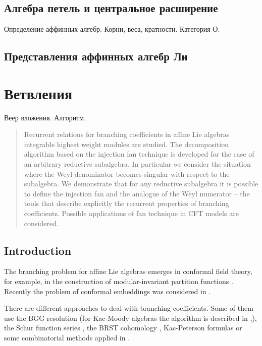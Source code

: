 \subsection{Алгебра петель и центральное расширение}
\label{sec:loop-algebra-central-extension}

Определение аффинных алгебр. Корни, веса, кратности. Категория О.

\subsection{Представления аффинных алгебр Ли}
\label{sec:affine-lie-algebra-representations}


\section{Ветвления}
\label{sec:branching}
Веер вложения. Алгоритм.


\begin{abstract}
  Recurrent relations for branching coefficients in affine Lie algebras
  integrable highest weight modules are studied. The decomposition algorithm
  based on the injection fan technique is developed for the case of an arbitrary
  reductive subalgebra. In particular we consider the situation where
  the Weyl denominator becomes singular with respect to the subalgebra.
  We demonstrate
  that for any reductive subalgebra it is possible to define the
  injection fan and the analogue of the Weyl numerator -- the tools that describe
  explicitly the recurrent properties of branching coefficients.
  Possible applications of fan technique in CFT models are considered.
\end{abstract}

\subsection{Introduction}
\label{sec:introduction}

The branching problem for affine Lie algebras emerges in conformal field theory, for example,
in the construction of modular-invariant partition functions \cite{difrancesco1997cft}.
Recently the problem of conformal embeddings was considered in \cite{coquereaux2008conformal}.

There are different approaches to deal with branching coefficients. Some of them use the BGG
resolution \cite{bernstein1975differential} (for Kac-Moody algebras the algorithm is described in
\cite{kac1990idl},\cite{wakimoto2001idl}), the Schur function series \cite{fauser2006new}, the BRST
cohomology \cite{Hwang:1994yr}, Kac-Peterson formulas \cite{kac1990idl,quella2002branching} or some
combinatorial methods applied in \cite{feigin707principal}.

